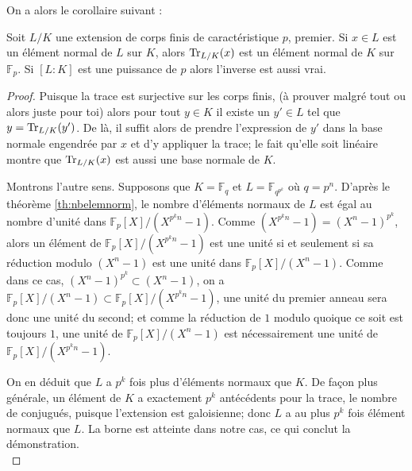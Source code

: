 \documentclass[a4paper]{article} %
\numberwithin{section}{part}
\numberwithin{equation}{section}
\newcommand\GF[1]{\mathbb{F}_{#1}}
\begin{document}
On a alors le corollaire suivant :
\begin{cor}
Soit $L/K$ une extension de corps finis de caractéristique $p$, premier. Si
$x\in L$ est un élément normal de $L$ sur $K$, alors $\textup{Tr}_{L/K}(x)$ est 
un élément normal de $K$ sur $\GF{p}$. Si $[L:K]$ est une puissance de $p$ alors
l'inverse est aussi vrai.
\end{cor}
\begin{proof}
Puisque la trace est surjective sur les corps finis, (à prouver malgré tout ou
alors juste pour toi) alors pour tout $y\in K$ il existe un $y'\in L$ tel que $y
= \textup{Tr}_{L/K}(y')$. De là, il suffit alors de prendre l'expression de $y'$
dans la base normale engendrée par $x$ et d'y appliquer la trace; le fait
qu'elle soit linéaire montre que $\textup{Tr}_{L/K}(x)$ est aussi une base 
normale de $K$.\par
Montrons l'autre sens. Supposons que $K = \GF{q}$ et $L = \GF{q^{p^k}}$ où $q
= p^n$. D'après le théorème \ref{th:nbelemnorm}, le nombre d'éléments normaux de
$L$ est égal au nombre d'unité dans $\GF{p}[X]/(X^{p^kn} - 1)$. Comme
$(X^{p^kn} - 1 ) = (X^n - 1)^{p^k}$, alors un élément de $\GF{p}[X]/(X^{p^kn} - 
1)$ est une unité si et seulement si sa réduction modulo $(X^n - 1)$ est une
unité dans $\GF{p}[X]/(X^n - 1)$.
Comme dans ce cas, $(X^n - 1)^{p^k} \subset (X^n - 1)$, on a $\GF{p}[X]/
(X^n - 1) \subset \GF{p}[X]/(X^{p^kn} - 1)$, une unité du premier anneau sera 
donc une unité du second; et comme la réduction de $1$ modulo quoique ce soit 
est toujours $1$, une unité de $\GF{p}[X]/(X^n - 1)$ est nécessairement une 
unité de $\GF{p}[X]/(X^{p^kn} - 1)$.\par
On en déduit que $L$ a $p^k$ fois plus d'éléments normaux que $K$. De façon plus
générale, un élément de $K$ a exactement $p^k$ antécédents pour la trace, le
nombre de conjugués, puisque l'extension est galoisienne; donc $L$ a au plus
$p^k$ fois élément normaux que $L$. La borne est atteinte dans notre cas, ce qui
conclut la démonstration.\\
\end{proof}
\end{document}
